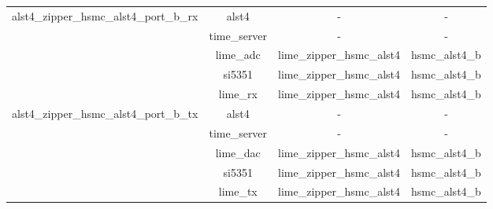 \documentclass{article}
\def\comp{alst4}
\begin{document}
\begin{tabular}{|c|c|c|c|}
	\hline
	\multirow{5}{*}{alst4\_zipper\_hsmc\_alst4\_port\_b\_rx}&
	\comp & - & - \\ &time\_server & - & - \\ &lime\_adc &
	lime\_zipper\_hsmc\_alst4 & hsmc\_alst4\_b \\  &si5351 &
	lime\_zipper\_hsmc\_alst4 & hsmc\_alst4\_b \\ &lime\_rx &
	lime\_zipper\_hsmc\_alst4 & hsmc\_alst4\_b \\
	\hline
	\multirow{5}{*}{alst4\_zipper\_hsmc\_alst4\_port\_b\_tx}&
	\comp & - & - \\ &time\_server & - & - \\ &lime\_dac &
	lime\_zipper\_hsmc\_alst4 & hsmc\_alst4\_b \\  &si5351 &
	lime\_zipper\_hsmc\_alst4 & hsmc\_alst4\_b \\ &lime\_tx &
	lime\_zipper\_hsmc\_alst4 & hsmc\_alst4\_b \\
	\hline
\end{tabular}

\newpage
\end{document}
